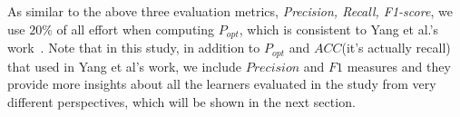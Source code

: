 As similar to the above three evaluation metrics, {\it Precision, Recall, F1-score}, we use $20\%$ of all effort when computing $P_{opt}$, which is consistent to Yang et al.'s work~\cite{yang2016effort}. Note that in this study, in addition to $P_{opt}$ and $ACC$(it's actually recall) that used in Yang et al's work\cite{yang2016effort}, we include 
$Precision$ and $F1$ measures and they provide more insights about all the learners evaluated in the study from very different perspectives, which will be shown in the next section.





